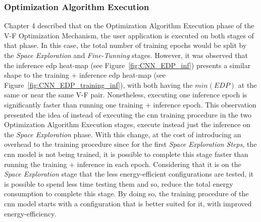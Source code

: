 \subsubsection{Optimization Algorithm Execution}

Chapter 4 described that on the Optimization Algorithm Execution phase of the V-F Optimization Mechanism, the user application is executed on both stages of that phase. In this case, the total number of training epochs would be split by the \textit{Space Exploration} and \textit{Fine-Tunning} stages. However, it was observed that the inference \acrshort{edp} heat-map (see Figure~\ref{fig:CNN_EDP_inf}) presents a similar shape to the training + inference \acrshort{edp} heat-map (see Figure~\ref{fig:CNN_EDP_training_inf}), with both having the $min(EDP)$ at the same or near the same V-F pair.
Nonetheless, executing one inference epoch is significantly faster than running one training + inference epoch. This observation presented the idea of instead of executing the \acrshort{cnn} training procedure in the two Optimization Algorithm Execution stages, execute instead just the inference on the \textit{Space Exploration} phase. With this change, at the cost of introducing an overhead to the training procedure since for the first \textit{Space Exploration Steps}, the \acrshort{cnn} model is not being trained, it is possible to complete this stage faster than running the training + inference in each epoch.
Considering that it is on the \textit{Space Exploration} stage that the less energy-efficient configurations are tested, it is possible to spend less time testing them and so, reduce the total energy consumption to complete this stage. 
By doing so, the training procedure of the \acrshort{cnn} model starts with a configuration that is better suited for it, with improved energy-efficiency. 

